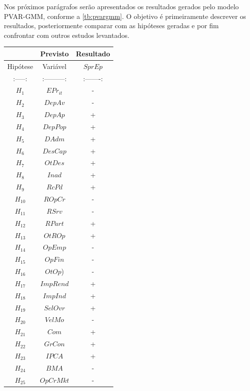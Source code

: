 \documentclass[
  12pt,
  12pt,
  openright,
  oneside,
  a4paper,
  chapter=TITLE,
  section=TITLE,
  subsection=TITLE,
  subsubsection=TITLE,
  english,
  portugues,
  sumario=tradicional]{abntex2}
\begin{document}
Nos próximos parágrafos serão apresentados os resultados gerados pelo modelo PVAR-GMM, conforme a \autoref{tb:pvargmm}. O objetivo é primeiramente descrever os resultados, posteriormente comparar com as hipóteses geradas e por fim confrontar com outros estudos levantados.

\vspace{20pt}
\vspace{-2mm}
\linespread{2}

\begin{longtable}[]{@{}ccc@{}}
\toprule
& Previsto & Resultado \\
\midrule
\endhead
Hipótese & Variável & \(SprEp\) \\
:-----: & :---------: & :-------: \\
\(H_{1}\) & \(EPr_{it}\) & - \\
\(H_{2}\) & \(DepAv\) & - \\
\(H_{3}\) & \(DepAp\) & + \\
\(H_{4}\) & \(DepPop\) & + \\
\(H_{5}\) & \(DAdm\) & + \\
\(H_{6}\) & \(DesCap\) & + \\
\(H_{7}\) & \(OtDes\) & + \\
\(H_{8}\) & \(Inad\) & + \\
\(H_{9}\) & \(RcPd\) & + \\
\(H_{10}\) & \(ROpCr\) & - \\
\(H_{11}\) & \(RSrv\) & - \\
\(H_{12}\) & \(RPart\) & + \\
\(H_{13}\) & \(OtROp\) & + \\
\(H_{14}\) & \(OpEmp\) & - \\
\(H_{15}\) & \(OpFin\) & - \\
\(H_{16}\) & \(OtOp\)) & - \\
\(H_{17}\) & \(ImpRend\) & + \\
\(H_{18}\) & \(ImpInd\) & + \\
\(H_{19}\) & \(SelOvr\) & + \\
\(H_{20}\) & \(VelMo\) & - \\
\(H_{21}\) & \(Com\) & + \\
\(H_{22}\) & \(GrCon\) & + \\
\(H_{23}\) & \(IPCA\) & + \\
\(H_{24}\) & \(BMA\) & - \\
\(H_{25}\) & \(OpCrMkt\) & - \\
\bottomrule
\end{longtable}
\end{document}
